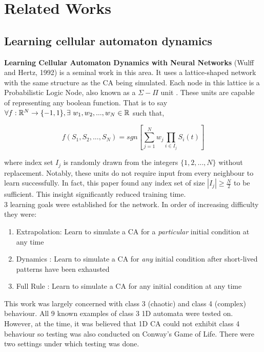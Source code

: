 \chapter{Related Works}

\section{Learning cellular automaton dynamics}

\noindent
\textbf{Learning Cellular Automaton Dynamics with Neural Networks} (Wulff and Hertz, 1992) \cite{wulff1992learning} is a seminal work in this area.
It uses a lattice-shaped network with the same structure as the CA being simulated.
Each node in this lattice is a Probabilistic Logic Node, also known as a $\Sigma-\Pi$ unit \cite{gurney1992training}.
These units are capable of representing any boolean function.
That is to say $ \forall f: \mathbb{R}^N \to \{-1, 1\}, \exists~w_1, w_2, ... , w_N \in \mathbb{R} $ such that,

\begin{equation} \label{eq:sigma_pi}
f(S_1, S_2, ..., S_N) = sgn\left[ \sum_{j=1}^{N} w_j \prod_{i \in I_j} S_i(t) \right]
\end{equation}

\noindent
where index set $I_j$ is randomly drawn from the integers $\{1, 2, ..., N\}$ without replacement.
Notably, these units do not require input from every neighbour to learn successfully.
In fact, this paper found any index set of size $|I_j| \geq \frac{N}{2}$ to be sufficient.
This insight significantly reduced training time.\\ 
3 learning goals were established for the network.
In order of increasing difficulty they were:

\begin{enumerate}
  \item Extrapolation: Learn to simulate a CA for a \textit{particular} initial condition at any time
  \item Dynamics : Learn to simulate a CA for \textit{any} initial condition after short-lived patterns have been exhausted
  \item Full Rule : Learn to simulate a CA for any initial condition at any time
\end{enumerate}

This work was largely concerned with class 3 (chaotic) and class 4 (complex) behaviour. 
All 9 known examples of class 3 1D automata were tested on.
However, at the time, it was believed that 1D CA could not exhibit class 4 behaviour so testing was also conducted on Conway's Game of Life.
There were two settings under which testing was done.
 

